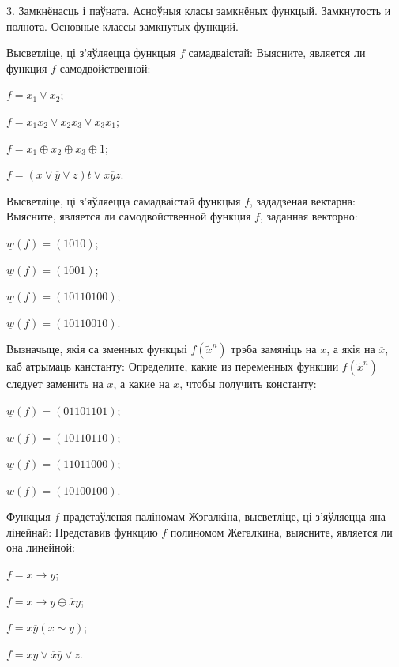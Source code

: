 \documentclass[12pt, a4paper]{article}
\begin{document}
\biLangHeader
{3. Замкнёнасць і паўната. Асноўныя класы замкнёных функцый.}
{Замкнутость и полнота. Основные классы замкнутых функций.}

\begin{problemList}

\problemItemWithCommonPart
{Высветліце, ці з'яўляецца функцыя $f$ самадваістай:}
{Выясните, является ли функция $f$ самодвойственной:}
{%
\begin{belarusianEnumerateTwocol}
    \item $f=x_1\vee x_2$;
    \item $f=x_1x_2\vee x_2x_3\vee x_3x_1$;
    \item $f=x_1\oplus x_2\oplus x_3\oplus 1$;
    \item $f=(x\vee \overline{y}\vee z)t\vee x\overline{y}z$.
\end{belarusianEnumerateTwocol}
}

\smallskip

\problemItemWithCommonPart
{Высветліце, ці з'яўляецца самадваістай функцыя $f$, зададзеная вектарна:}
{Выясните, является ли самодвойственной функция $f$, заданная векторно:}
{%
\begin{belarusianEnumerateTwocol}
    \item $\underline{w}(f)=(1010)$;
    \item $\underline{w}(f)=(1001)$;
    \item $\underline{w}(f)=(10110100)$;
    \item $\underline{w}(f)=(10110010)$.
\end{belarusianEnumerateTwocol}
}

\smallskip

\problemItemWithCommonPart
{Вызначыце, якія са зменных функцыі $f(\tilde x^n)$ трэба замяніць на $x$,
а якія на $\overline{x}$, каб атрымаць канстанту:}
{Определите, какие из переменных функции $f(\tilde x^n)$ следует заменить на $x$,
а какие на $\overline{x}$, чтобы получить константу:}
{%
\begin{belarusianEnumerateTwocol}
    \item $\underline{w}(f)=(01101101)$;
    \item $\underline{w}(f)=(10110110)$;
    \item $\underline{w}(f)=(11011000)$;
    \item $\underline{w}(f)=(10100100)$.
\end{belarusianEnumerateTwocol}
}

\smallskip

\problemItemWithCommonPart
{Функцыя $f$ прадстаўленая паліномам Жэгалкіна, высветліце, ці з'яўляецца яна лінейнай:}
{Представив функцию $f$ полиномом Жегалкина, выясните, является ли она линейной:}
{%
\begin{belarusianEnumerateTwocol}
    \item $f=x\rightarrow y$;
    \item $f=\overline{x\rightarrow y}\oplus\overline{x}y$;
    \item $f=x\overline{y}(x\sim y)$;
    \item $f=xy\vee\overline{x}\overline{y}\vee z$.
\end{belarusianEnumerateTwocol}
}


\end{problemList}
\end{document}
